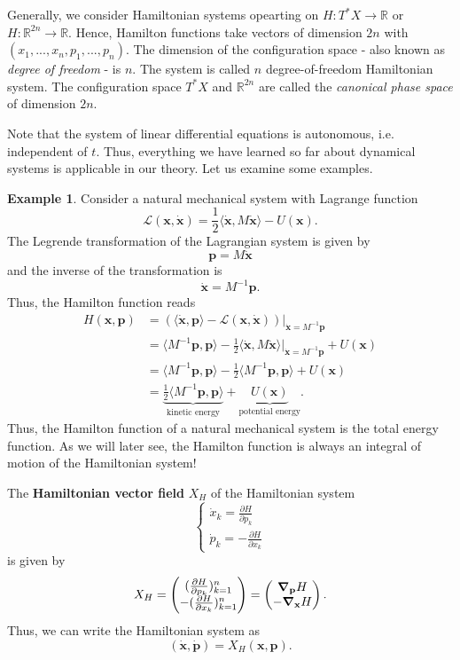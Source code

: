 \documentclass[hidelinks,a4paper, 11pt]{article}
\theoremstyle{plain}
\theoremstyle{break}
\theoremstyle{plain}
\theoremstyle{definition}
\newtheorem*{example}{Example}
\begin{document}
{Generally, we consider Hamiltonian systems opearting on $H: T^*X \to \mathbb R$ or $H: \mathbb R^{2n} \to \mathbb R$. Hence, Hamilton functions take vectors of dimension $2n$ with $(x_1,...,x_n,p_1,...,p_n)$. The dimension of the configuration space - also known as \emph{degree of freedom} - is $n$. The system is called $n$ degree-of-freedom Hamiltonian system. The configuration space $T^*X$ and $\mathbb R^{2n}$ are called the \emph{canonical phase space} of dimension $2n$.

Note that the system of linear differential equations is autonomous, i.e. independent of $t$. Thus, everything we have learned so far about dynamical systems is applicable in our theory. Let us examine some examples.

\begin{example}
Consider a natural mechanical system with Lagrange function
\[
	\mathcal L(\mathbf x, \mathbf{\dot x}) = \frac{1}{2}\langle \mathbf{\dot x}, M \mathbf{\dot x} \rangle - U(\mathbf x).
\]
The Legrende transformation of the Lagrangian system is given by
\[
	\mathbf p = M \mathbf{\dot x} 
\]
and the inverse of the transformation is
\[
	\mathbf{\dot x} = M^{-1}\mathbf p.
\]
Thus, the Hamilton function reads
\begin{align*}
H(\mathbf x, \mathbf p) &= \left(\langle \mathbf{\dot x}, \mathbf p \rangle - \mathcal L(\mathbf x, \mathbf{\dot x}) \right) \Big |_{\mathbf{\dot x} = M^{-1}\mathbf p} \\
&= \langle M^{-1}\mathbf p, \mathbf p \rangle - \frac{1}{2}\langle \mathbf{\dot x}, M \mathbf{\dot x} \rangle \Big |_{\mathbf{\dot x}= M^{-1}\mathbf p} + U(\mathbf x) \\
&= \langle M^{-1}\mathbf p, \mathbf p \rangle - \frac{1}{2}\langle M^{-1} \mathbf p, \mathbf p \rangle + U(\mathbf x) \\
&= \underbrace{\frac{1}{2} \langle M^{-1}\mathbf p, \mathbf p \rangle}_{\text{kinetic energy}}  + \underbrace{U(\mathbf x)}_{\text{potential energy}}.
\end{align*}
Thus, the Hamilton function of a natural mechanical system is the total energy function. As we will later see, the Hamilton function is always an integral of motion of the Hamiltonian system!
\end{example}

The \textbf{Hamiltonian vector field} $X_H$ of the Hamiltonian system
\[
	\begin{cases}
	\dot x_k = \frac{\partial H}{\partial p_k} \\
	\dot p_k = -\frac{\partial H}{\partial x_k}
	\end{cases}
\]
is given by
\[
	X_H = \begin{pmatrix}
		(\frac{\partial H }{\partial p_k})^n_{k=1} \\ -(\frac{\partial H}{\partial x_k})^n_{k=1}
	\end{pmatrix} = \begin{pmatrix}
	 \grad_{\mathbf p}{H} \\
	 -\grad_{\mathbf x}{H}
	\end{pmatrix}.
\]
Thus, we can write the Hamiltonian system as 
\[
	(\mathbf{\dot x}, \mathbf{\dot p}) = X_H(\mathbf x, \mathbf p).
\]

}
\end{document}
